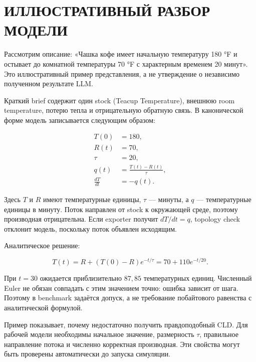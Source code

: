 \chapter{ИЛЛЮСТРАТИВНЫЙ РАЗБОР МОДЕЛИ}
\label{app:example}

Рассмотрим описание: «Чашка кофе имеет начальную температуру 180 °F и остывает до комнатной температуры 70 °F с характерным временем 20 минут». Это иллюстративный пример представления, а не утверждение о независимо полученном результате LLM.

Краткий brief содержит один stock (Teacup Temperature), внешнюю room temperature, потерю тепла и отрицательную обратную связь. В канонической форме модель записывается следующим образом:

\begin{align}
    T(0)&=180,\\
    R(t)&=70,\\
    \tau&=20,\\
    q(t)&=\frac{T(t)-R(t)}{\tau},\\
    \frac{dT}{dt}&=-q(t).
\end{align}

Здесь $T$ и $R$ имеют температурные единицы, $\tau$ --- минуты, а $q$ --- температурные единицы в минуту. Поток направлен от stock к окружающей среде, поэтому производная отрицательна. Если exporter получит $dT/dt=q$, topology check отклонит модель, поскольку поток объявлен исходящим.

Аналитическое решение:

\begin{equation}
    T(t)=R+(T(0)-R)e^{-t/\tau}=70+110e^{-t/20}.
\end{equation}

При $t=30$ ожидается приблизительно $87{,}85$ температурных единиц. Численный Euler не обязан совпадать с этим значением точно: ошибка зависит от шага. Поэтому в benchmark задаётся допуск, а не требование побайтового равенства с аналитической формулой.

Пример показывает, почему недостаточно получить правдоподобный CLD. Для рабочей модели необходимы начальное значение, размерность $\tau$, правильное направление потока и численно корректная производная. Эти свойства могут быть проверены автоматически до запуска симуляции.

